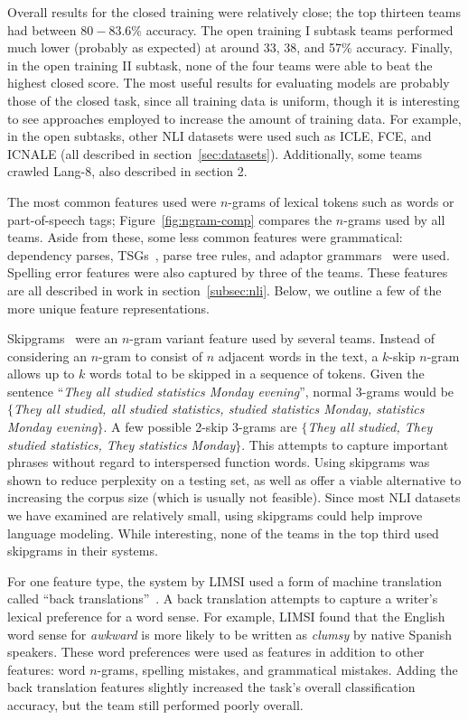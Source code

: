 Overall results for the closed training were relatively close; the top thirteen
teams had between $80-83.6\%$ accuracy. The open training I subtask teams
performed much lower (probably as expected) at around 33, 38, and 57$\%$
accuracy. Finally, in the open training II subtask, none of the four teams were
able to beat the highest closed score. The most useful results for evaluating
models are probably those of the closed task, since all training data is
uniform, though it is interesting to see approaches employed to increase the
amount of training data. For example, in the open subtasks, other NLI datasets
were used such as ICLE, FCE, and ICNALE (all described in
section~\ref{sec:datasets}). Additionally, some teams crawled Lang-8, also
described in section 2.



The most common features used were $n$-grams of lexical tokens such as words or
part-of-speech tags; Figure~\ref{fig:ngram-comp} compares the $n$-grams used by
all teams. Aside from these, some less common features were grammatical:
dependency parses, TSGs~\cite{tsgs}, parse tree rules, and adaptor grammars~\cite{adaptor-grammars} were used. Spelling error features were also
captured by three of the teams. These features are all described in work in
section~\ref{subsec:nli}. Below, we outline a few of the more unique feature
representations.

Skipgrams~\cite{skipgrams} were an $n$-gram variant feature used by several
teams. Instead of considering an $n$-gram to consist of $n$ adjacent words in
the text, a $k$-skip $n$-gram allows up to $k$ words total to be skipped in a
sequence of tokens. Given the sentence ``\emph{They all studied statistics
Monday evening}'', normal 3-grams would be $\{$\emph{They all studied, all
studied statistics, studied statistics Monday, statistics Monday evening}$\}$. A
few possible 2-skip 3-grams are $\{$\emph{They all studied, They studied
statistics, They statistics Monday}$\}$. This attempts to capture important
phrases without regard to interspersed function words. Using skipgrams was shown
to reduce perplexity on a testing set, as well as offer a viable alternative to
increasing the corpus size (which is usually not feasible). Since most NLI
datasets we have examined are relatively small, using skipgrams could help
improve language modeling. While interesting, none of the teams in the top third
used skipgrams in their systems.

For one feature type, the system by LIMSI used a form of machine translation
called ``back translations''~\cite{nli-mt}. A back translation attempts to
capture a writer's lexical preference for a word sense. For example, LIMSI found
that the English word sense for \emph{awkward} is more likely to be written as
\emph{clumsy} by native Spanish speakers. These word preferences were used as
features in addition to other features: word $n$-grams, spelling mistakes, and
grammatical mistakes. Adding the back translation features slightly increased
the task's overall classification accuracy, but the team still performed poorly
overall.


